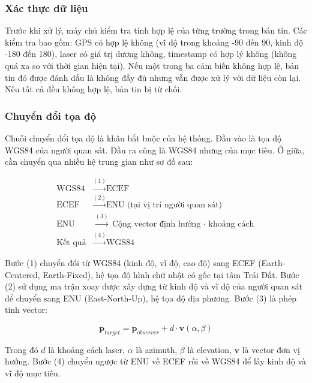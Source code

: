 \subsubsection{Xác thực dữ liệu}

\hspace{0.5cm} Trước khi xử lý, máy chủ kiểm tra tính hợp lệ của từng trường trong bản tin. Các kiểm tra bao gồm: GPS có hợp lệ không (vĩ độ trong khoảng -90 đến 90, kinh độ -180 đến 180), laser có giá trị dương không, timestamp có hợp lý không (không quá xa so với thời gian hiện tại). Nếu một trong ba cảm biến không hợp lệ, bản tin đó được đánh dấu là không đầy đủ nhưng vẫn được xử lý với dữ liệu còn lại. Nếu tất cả đều không hợp lệ, bản tin bị từ chối.

\subsubsection{Chuyển đổi tọa độ}

\hspace{0.5cm} Chuỗi chuyển đổi tọa độ là khâu bắt buộc của hệ thống. Đầu vào là tọa độ WGS84 của người quan sát. Đầu ra cũng là WGS84 nhưng của mục tiêu. Ở giữa, cần chuyển qua nhiều hệ trung gian như sơ đồ sau:

\begin{equation}
\begin{aligned}
\text{WGS84} &\xrightarrow{(1)} \text{ECEF} \\
\text{ECEF} &\xrightarrow{(2)} \text{ENU (tại vị trí người quan sát)} \\
\text{ENU} &\xrightarrow{(3)} \text{Cộng vector định hướng $\cdot$ khoảng cách} \\
\text{Kết quả} &\xrightarrow{(4)} \text{WGS84}
\end{aligned}
\end{equation}

Bước (1) chuyển đổi từ WGS84 (kinh độ, vĩ độ, cao độ) sang ECEF (Earth-Centered, Earth-Fixed), hệ tọa độ hình chữ nhật có gốc tại tâm Trái Đất. Bước (2) sử dụng ma trận xoay được xây dựng từ kinh độ và vĩ độ của người quan sát để chuyển sang ENU (East-North-Up), hệ tọa độ địa phương. Bước (3) là phép tính vector:

\begin{equation}
\mathbf{p}_{target} = \mathbf{p}_{observer} + d \cdot \mathbf{v}(\alpha, \beta)
\end{equation}

Trong đó $d$ là khoảng cách laser, $\alpha$ là azimuth, $\beta$ là elevation, $\mathbf{v}$ là vector đơn vị hướng. Bước (4) chuyển ngược từ ENU về ECEF rồi về WGS84 để lấy kinh độ và vĩ độ mục tiêu.


